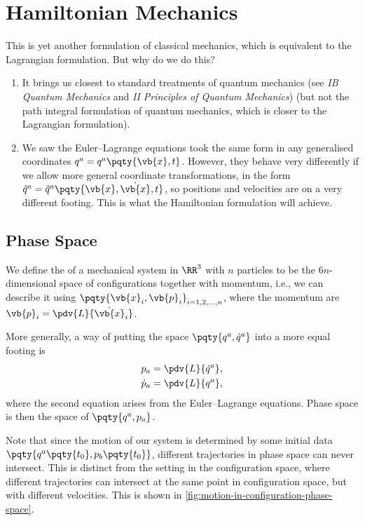 \section{Hamiltonian Mechanics}

This is yet another formulation of classical mechanics, which is equivalent to the Lagrangian formulation. But why do we do this?

\begin{enumerate}[label=(\roman*)]
    \item It brings us closest to standard treatments of quantum mechanics (see \textit{IB Quantum Mechanics} and \textit{II Principles of Quantum Mechanics}) (but not the path integral formulation of quantum mechanics, which is closer to the Lagrangian formulation).
    \item We saw the Euler--Lagrange equations took the same form in any generalised coordinates \(q^a = q^a \pqty{\vb{x}, t}\). However, they behave very differently if we allow more general coordinate transformations, in the form \(\tilde{q}^a = \tilde{q}^a \pqty{\vb{x}, \dot{\vb{x}}, t}\), so positions and velocities are on a very different footing. This is what the Hamiltonian formulation will achieve.
\end{enumerate}

\subsection{Phase Space}

We define the  of a mechanical system in \(\RR^3\) with \(n\) particles to be the \(6n\)-dimensional space of configurations together with momentum, i.e., we can describe it using \(\pqty{\vb{x}_i, \vb{p}_i}_{i = 1, 2, \ldots, n}\), where the momentum are \(\vb{p}_i = \pdv{L}{\dot{\vb{x}}_i}\).

More generally, a way of putting the space \(\pqty{q^a, \dot{q}^a}\) into a more equal footing is
\begin{subequations}
    \begin{align}
        p_a &= \pdv{L}{\dot{q}^a}, \\
        \dot{p}_a &= \pdv{L}{q^a},
    \end{align}
\end{subequations}
where the second equation arises from the Euler--Lagrange equations. Phase space is then the space of \(\pqty{q^a, p_a}\).

Note that since the motion of our system is determined by some initial data \(\pqty{q^a\pqty{t_0}, p_b\pqty{t_0}}\), different trajectories in phase space can never intersect. This is distinct from the setting in the configuration space, where different trajectories can intersect at the same point in configuration space, but with different velocities. This is shown in \autoref{fig:motion-in-configuration-phase-space}.

